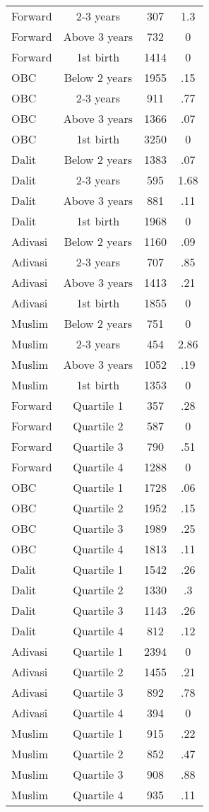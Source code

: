 \begin{tabular}{lccc}
Forward&2-3 years&307&1.3\\
Forward&Above 3 years&732&0\\
Forward&1st birth&1414&0\\
OBC&Below 2 years&1955&.15\\
OBC&2-3 years&911&.77\\
OBC&Above 3 years&1366&.07\\
OBC&1st birth&3250&0\\
Dalit&Below 2 years&1383&.07\\
Dalit&2-3 years&595&1.68\\
Dalit&Above 3 years&881&.11\\
Dalit&1st birth&1968&0\\
Adivasi&Below 2 years&1160&.09\\
Adivasi&2-3 years&707&.85\\
Adivasi&Above 3 years&1413&.21\\
Adivasi&1st birth&1855&0\\
Muslim&Below 2 years&751&0\\
Muslim&2-3 years&454&2.86\\
Muslim&Above 3 years&1052&.19\\
Muslim&1st birth&1353&0\\
Forward&Quartile 1&357&.28\\
Forward&Quartile 2&587&0\\
Forward&Quartile 3&790&.51\\
Forward&Quartile 4&1288&0\\
OBC&Quartile 1&1728&.06\\
OBC&Quartile 2&1952&.15\\
OBC&Quartile 3&1989&.25\\
OBC&Quartile 4&1813&.11\\
Dalit&Quartile 1&1542&.26\\
Dalit&Quartile 2&1330&.3\\
Dalit&Quartile 3&1143&.26\\
Dalit&Quartile 4&812&.12\\
Adivasi&Quartile 1&2394&0\\
Adivasi&Quartile 2&1455&.21\\
Adivasi&Quartile 3&892&.78\\
Adivasi&Quartile 4&394&0\\
Muslim&Quartile 1&915&.22\\
Muslim&Quartile 2&852&.47\\
Muslim&Quartile 3&908&.88\\
Muslim&Quartile 4&935&.11\\
\bottomrule
\end{tabular}
